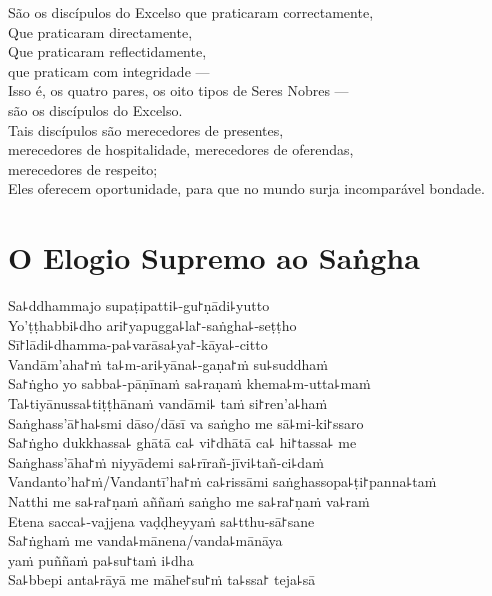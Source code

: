 São os discípulos do Excelso que praticaram correctamente,\\
Que praticaram directamente,\\
Que praticaram reflectidamente,\\
 que praticam com integridade ---\\
Isso é, os quatro pares, os oito tipos de Seres Nobres ---\\
 são os discípulos do Excelso.\\
Tais discípulos são merecedores de presentes,\\
\vin merecedores de hospitalidade, merecedores de oferendas,\\
\vin merecedores de respeito;\\
Eles oferecem oportunidade, para que no mundo surja incomparável bondade.

\clearpage

\chapter*{O Elogio Supremo ao Saṅgha}

\begin{leader}
\end{leader}

Sa꜕ddhammajo supaṭipatti꜕-gu꜓ṇādi꜕yutto\\
Yo'ṭṭhabbi꜕dho ari꜓yapugga꜕la꜓-saṅgha꜕-seṭṭho\\
Sī꜓lādi꜕dhamma-pa꜕varāsa꜕ya꜓-kāya꜕-citto\\
Vandām'aha꜓ṁ ta꜕m-ari꜕yāna꜕-gaṇa꜓ṁ su꜕suddhaṁ\\
Sa꜓ṅgho yo sabba꜕-pāṇīnaṁ sa꜕raṇaṁ khema꜕m-utta꜕maṁ\\
Ta꜕tiyānussa꜕tiṭṭhānaṁ vandāmi꜕ taṁ si꜓ren'a꜕haṁ\\
Saṅghass'ā꜓ha꜕smi dāso/dāsī va saṅgho me sā꜕mi-ki꜓ssaro\\
Sa꜓ṅgho dukkhassa꜕ ghātā ca꜕ vi꜓dhātā ca꜕ hi꜓tassa꜕ me\\
Saṅghass'āha꜓ṁ niyyādemi sa꜕rīrañ-jīvi꜕tañ-ci꜕daṁ\\
Vandanto'ha꜓ṁ/Vandantī'ha꜓ṁ ca꜕rissāmi saṅghassopa꜕ṭi꜓panna꜕taṁ\\
Natthi me sa꜕ra꜓ṇaṁ aññaṁ saṅgho me sa꜕ra꜓ṇaṁ va꜕raṁ\\
Etena sacca꜕-vajjena vaḍḍheyyaṁ sa꜕tthu-sā꜓sane\\
Sa꜓ṅghaṁ me vanda꜕mānena/vanda꜕mānāya\\
\vin yaṁ puññaṁ pa꜕su꜓taṁ i꜕dha\\
Sa꜕bbepi anta꜕rāyā me māhe꜓su꜓ṁ ta꜕ssa꜓ teja꜕sā

